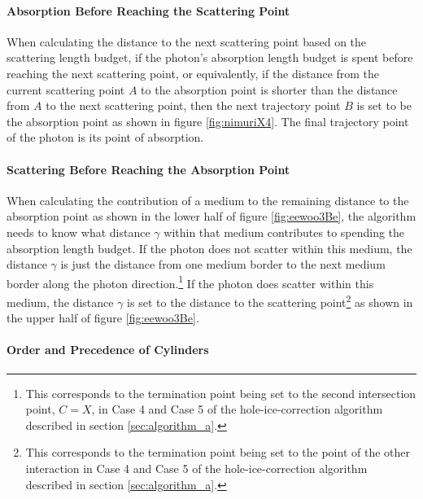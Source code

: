 \paragraph{Absorption Before Reaching the Scattering Point}
When calculating the distance to the next scattering point based on the scattering length budget, if the photon's absorption length budget is spent before reaching the next scattering point, or equivalently, if the distance from the current scattering point $A$ to the absorption point is shorter than the distance from $A$ to the next scattering point, then the next trajectory point $B$ is set to be the absorption point as shown in figure \ref{fig:nimuriX4}. The final trajectory point of the photon is its point of absorption.

\paragraph{Scattering Before Reaching the Absorption Point}
When calculating the contribution of a medium to the remaining distance to the absorption point as shown in the lower half of figure \ref{fig:eewoo3Be}, the algorithm needs to know what distance $\gamma$ within that medium contributes to spending the absorption length budget.
If the photon does not scatter within this medium, the distance $\gamma$ is just the distance from one medium border to the next medium border along the photon direction.\footnote{This corresponds to the termination point being set to the second intersection point, $C = X$, in Case 4 and Case 5 of the hole-ice-correction algorithm described in section \ref{sec:algorithm_a}.}
If the photon does scatter within this medium, the distance $\gamma$ is set to the distance to the scattering point\footnote{This corresponds to the termination point being set to the point of the other interaction in Case 4 and Case 5 of the hole-ice-correction algorithm described in section \ref{sec:algorithm_a}.} as shown in the upper half of figure \ref{fig:eewoo3Be}.

\paragraph{Order and Precedence of Cylinders}

